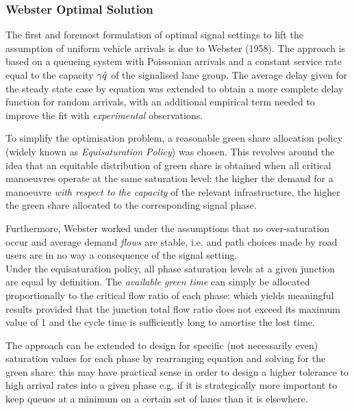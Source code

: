 \subsubsection*{Webster Optimal Solution}
The first and foremost formulation of optimal signal settings to lift the assumption of uniform vehicle arrivals is due to Webster (1958). The approach is based on a queueing system with Poissonian arrivals and a constant service rate equal to the capacity $\gamma_{} \hat{q}$ of the signalised lane group.
The average delay given for the steady state case by equation  was extended to obtain a more complete delay function for random arrivals, with an additional empirical term needed to
improve the fit with \emph{experimental} observations.

To simplify the optimisation problem, a reasonable green share allocation policy (widely
known as \emph{Equisaturation Policy}) was chosen. This revolves around the idea that an equitable
distribution of green share is obtained when all critical manoeuvres operate at the same
saturation level: the higher the demand for a manoeuvre \emph{with respect to the capacity} of the
relevant infrastructure, the higher the green share allocated to the corresponding signal phase.

Furthermore, Webster worked under the assumptions that no over-saturation occur and average demand \emph{flows} are stable, i.e. and path choices made by road users are in no way a consequence of
the signal setting.\\
Under the equisaturation policy, all phase saturation levels at a given junction are equal
by definition. The \emph{available green time} can simply be allocated proportionally to the critical
flow ratio of each phase:
which yields meaningful results provided that the junction total flow ratio does not exceed its
maximum value of 1 and the cycle time is sufficiently long to amortise the lost time.

The approach can be extended to design for specific (not necessarily even) saturation
values for each phase by rearranging equation  and solving for the green share: this may have practical sense in order to design a higher tolerance to high arrival rates
into a given phase e.g. if it is strategically more important to keep queues at a minimum on a
certain set of lanes than it is elsewhere.

